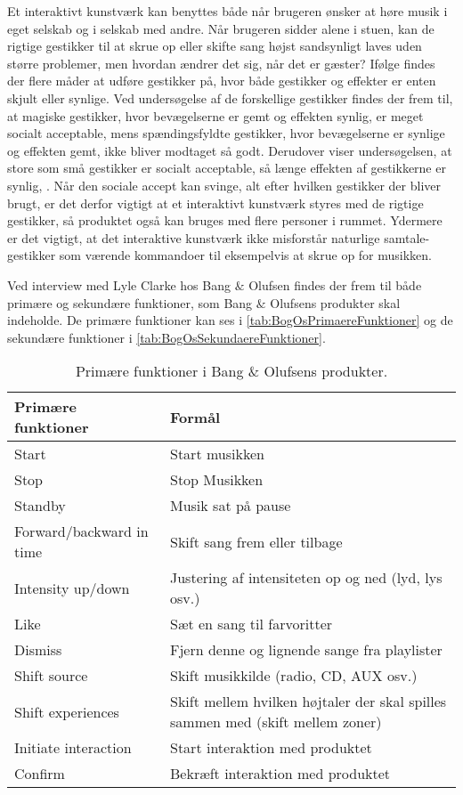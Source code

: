 Et interaktivt kunstværk kan benyttes både når brugeren ønsker at høre musik i eget selskab og i selskab med andre. Når brugeren sidder alene i stuen, kan de rigtige gestikker til at skrue op eller skifte sang højst sandsynligt laves uden større problemer, men hvordan ændrer det sig, når det er gæster? Ifølge \textcite[ss. 276-277]{PDF:WouldYouDoThat} findes der flere måder at udføre gestikker på, hvor både gestikker og effekter er enten skjult eller synlige. Ved undersøgelse af de forskellige gestikker findes der frem til, at magiske gestikker, hvor bevægelserne er gemt og effekten synlig, er meget socialt acceptable, mens spændingsfyldte gestikker, hvor bevægelserne er synlige og effekten gemt, ikke bliver modtaget så godt. Derudover viser undersøgelsen, at store som små gestikker er socialt acceptable, så længe effekten af gestikkerne er synlig, \parencite[s. 278]{PDF:WouldYouDoThat}. Når den sociale accept kan svinge, alt efter hvilken gestikker der bliver brugt, er det derfor vigtigt at et interaktivt kunstværk styres med de rigtige gestikker, så produktet også kan bruges med flere personer i rummet. Ydermere er det vigtigt, at det interaktive kunstværk ikke misforstår naturlige samtale-gestikker som værende kommandoer til eksempelvis at skrue op for musikken. 

Ved interview med Lyle Clarke hos Bang $\&$ Olufsen findes der frem til både primære og sekundære funktioner, som Bang $\&$ Olufsens produkter skal indeholde. De primære funktioner kan ses i \autoref{tab:BogOsPrimaereFunktioner} og de sekundære funktioner i \autoref{tab:BogOsSekundaereFunktioner}.

%
\begin{table}[H]
	\centering
	\begin{tabular}{ | l | p{8cm} |}
		\hline
		\multicolumn{1}{|l|}{\textbf{Primære funktioner}} & \multicolumn{1}{l|}{\textbf{Formål}} \\ \hline
		Start & Start musikken \\ \hline
		Stop & Stop Musikken \\ \hline
		Standby & Musik sat på pause \\ \hline
		Forward/backward in time & Skift sang frem eller tilbage \\ \hline
		Intensity up/down & Justering af intensiteten op og ned (lyd, lys osv.) \\ \hline
		Like & Sæt en sang til farvoritter \\ \hline
		Dismiss & Fjern denne og lignende sange fra playlister \\ \hline
		Shift source & Skift musikkilde (radio, CD, AUX osv.) \\ \hline
		Shift experiences & Skift mellem hvilken højtaler der skal spilles sammen med (skift mellem zoner) \\ \hline
		Initiate interaction & Start interaktion med produktet \\ \hline
		Confirm & Bekræft interaktion med produktet \\ \hline
	\end{tabular}
	\caption{Primære funktioner i Bang $\&$ Olufsens produkter.}
	\label{tab:BogOsPrimaereFunktioner}
\end{table}
\noindent
%

